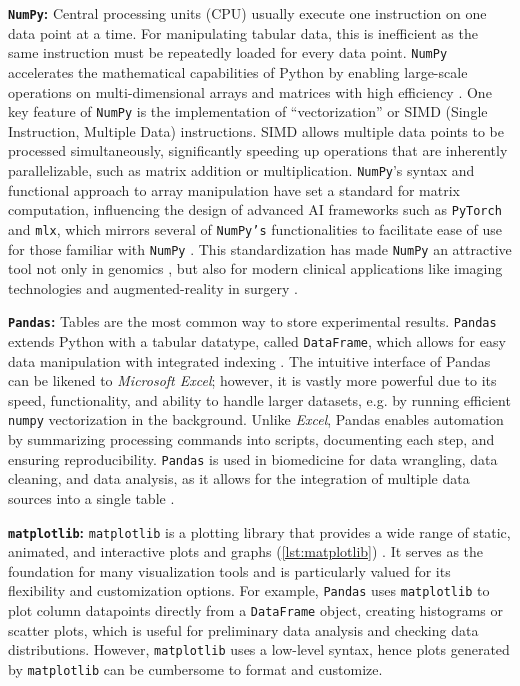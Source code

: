 \textbf{\texttt{NumPy}:} Central processing units (CPU) usually execute one
instruction on one data point at a time. For manipulating tabular data, this is
inefficient as the same instruction must be repeatedly loaded for every data
point. \texttt{NumPy} accelerates the mathematical capabilities of Python by
enabling large-scale operations on multi-dimensional arrays and matrices with
high efficiency \cite{harrisArrayProgrammingNumPy2020}. One key feature of
\texttt{NumPy} is the implementation of ``vectorization'' or SIMD (Single
Instruction, Multiple Data) instructions. SIMD allows multiple data points to be
processed simultaneously, significantly speeding up operations that are
inherently parallelizable, such as matrix addition or multiplication.
\texttt{NumPy}'s syntax and functional approach to array manipulation have set a
standard for matrix computation, influencing the design of advanced AI
frameworks such as \texttt{PyTorch} and \texttt{mlx}, which mirrors several of
\texttt{NumPy's} functionalities to facilitate ease of use for those familiar
with \texttt{NumPy} \cite{paszkePyTorchImperativeStyle2019,hannunMLX2023}.
This standardization has made \texttt{NumPy} an attractive tool not only in
genomics \cite{dingPyComplexHeatmapPythonPackage2023}, but also for modern
clinical applications like imaging technologies and augmented-reality in
surgery \cite{thompsonSciKitSurgeryCompactLibraries2020}.


\textbf{\texttt{Pandas}:} Tables are the most common way to store experimental
results. \texttt{Pandas} extends Python with a tabular datatype, called
\texttt{DataFrame}, which allows for easy data manipulation with integrated
indexing \cite{mckinneyPandasFoundationalPython2011}. The intuitive interface of
Pandas can be likened to \textit{Microsoft Excel}; however, it is vastly more
powerful due to its speed, functionality, and ability to handle larger datasets,
e.g. by running efficient \texttt{numpy} vectorization in the background. Unlike
\textit{Excel}, Pandas enables automation by summarizing processing commands
into scripts, documenting each step, and ensuring reproducibility.
\texttt{Pandas} is used in biomedicine for data wrangling, data cleaning, and
data analysis, as it allows for the integration of multiple data sources into a
single table \cite{santosCOVID19ScholarlyProduction2020}.

\textbf{\texttt{matplotlib}:} \texttt{matplotlib} is a plotting library that
provides a wide range of static, animated, and interactive plots and graphs
(\autoref{lst:matplotlib}) \cite{hunterMatplotlib2DGraphics2007}. It serves as the
foundation for many visualization tools and is particularly valued for its
flexibility and customization options. For example, \texttt{Pandas} uses
\texttt{matplotlib} to plot column datapoints directly from a \texttt{DataFrame}
object, creating histograms or scatter plots, which is useful for preliminary
data analysis and checking data distributions. However, \texttt{matplotlib} uses
a low-level syntax, hence plots generated by \texttt{matplotlib} can be
cumbersome to format and customize.


